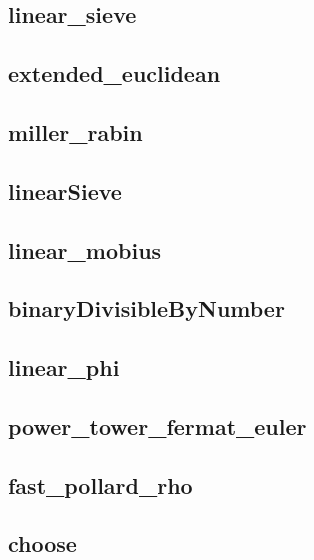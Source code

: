 \subsection{linear_sieve}
\raggedbottom
\hrulefill
\subsection{extended_euclidean}
\raggedbottom
\hrulefill
\subsection{miller_rabin}
\raggedbottom
\hrulefill
\subsection{linearSieve}
\raggedbottom
\hrulefill
\subsection{linear_mobius}
\raggedbottom
\hrulefill
\subsection{binaryDivisibleByNumber}
\raggedbottom
\hrulefill
\subsection{linear_phi}
\raggedbottom
\hrulefill
\subsection{power_tower_fermat_euler}
\raggedbottom
\hrulefill
\subsection{fast_pollard_rho}
\raggedbottom
\hrulefill
\subsection{choose}
\raggedbottom
\hrulefill
